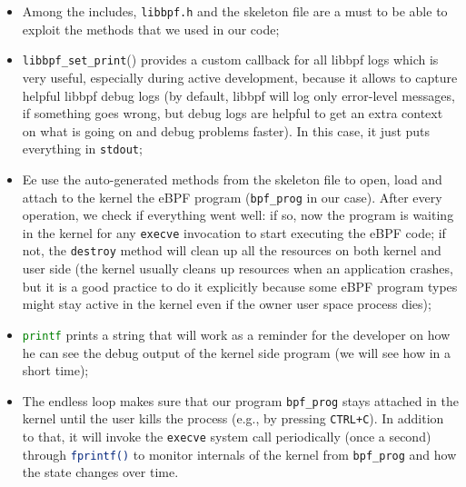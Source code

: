 \begin{itemize}
	\item 
		Among the includes, \colorbox{backcolour}{\lstinline[style=commandline, language=bash, breaklines=true]|libbpf.h|} and the skeleton file are a must to be able to exploit the methods that we used in our code;
	\item 
		\colorbox{backcolour}{\lstinline[style=commandline, language=bash, breaklines=true]|libbpf_set_print|()} provides a custom callback for all libbpf logs which is very useful, especially during active development, because it allows to capture helpful libbpf debug logs (by default, libbpf will log only error-level messages, if something goes wrong, but debug logs are helpful to get an extra context on what is going on and debug problems faster).
		In this case, it just puts everything in \colorbox{backcolour}{\lstinline[style=commandline, language=bash, breaklines=true]|stdout|};
	\item 
		Ee use the auto-generated methods from the skeleton file to open, load and attach to the kernel the eBPF program (\colorbox{backcolour}{\lstinline[style=commandline, language=bash, breaklines=true]|bpf_prog|} in our case). 
		After every operation, we check if everything went well: if so, now the program is waiting in the kernel for any \colorbox{backcolour}{\lstinline[style=commandline, language=bash, breaklines=true]|execve|} invocation to start executing the eBPF code; if not, the \colorbox{backcolour}{\lstinline[style=commandline, language=bash, breaklines=true]|destroy|} method will clean up all the resources on both kernel and user side (the kernel usually cleans up resources when an application crashes, but it is a good practice to do it explicitly because some eBPF program types might stay active in the kernel even if the owner user space process dies);
	\item 
		\colorbox{backcolour}{\lstinline[style=commandline, language=bash, breaklines=true]|printf|} prints a string that will work as a reminder for the developer on how he can see the debug output of the kernel side program (we will see how in a short time);
	\item 
		The endless loop makes sure that our program \colorbox{backcolour}{\lstinline[style=commandline, language=bash, breaklines=true]|bpf_prog|} stays attached in the kernel until the user kills the process (e.g., by pressing \colorbox{backcolour}{\lstinline[style=commandline, language=bash, breaklines=true]|CTRL+C|}). 
		In addition to that, it will invoke the \colorbox{backcolour}{\lstinline[style=commandline, language=bash, breaklines=true]|execve|} system call periodically (once a second) through \colorbox{backcolour}{\lstinline[style=commandline, language=bash, breaklines=true]|fprintf()|} to monitor internals of the kernel from \colorbox{backcolour}{\lstinline[style=commandline, language=bash, breaklines=true]|bpf_prog|} and how the state changes over time.
\end{itemize}

